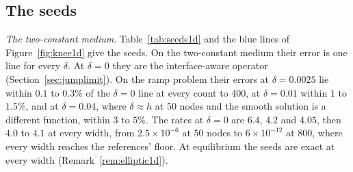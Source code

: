 \documentclass[11pt]{amsart}
\theoremstyle{definition}
\theoremstyle{remark}
\newcommand{\para}[1]{\par\smallskip\noindent\textit{#1}.\enspace}
\newcommand{\sci}[2]{#1 \times 10^{#2}}
\begin{document}
\subsection{The seeds}
\label{sec:seedrates1d}
\begin{table}
  \centering
  \caption{The seeds on the ramp problem at $t = 2$: $\|e\|_2 / \|u\|_2$ at
  the nodes, with the rate per doubling of $n$ in parentheses. Errors of
  $\sci{4}{-12}$ to $\sci{2}{-11}$ on the two-constant medium and a few
  times $10^{-11}$ on the sinusoidal one are round-off, of the references
  (Section~\ref{sec:media1d}) and of the solve, where the rates mean
  nothing.}
  \label{tab:seeds1d}
  \footnotesize
  
\end{table}

\para{The two-constant medium}
Table~\ref{tab:seeds1d} and the blue lines of Figure~\ref{fig:knee1d} give
the seeds. On the two-constant medium their error is one line for every
$\delta$. At $\delta = 0$ they are the interface-aware operator
(Section~\ref{sec:jumplimit}). On the ramp problem their errors at
$\delta = 0.0025$ lie within $0.1$ to $0.3\%$ of the $\delta = 0$ line at
every count to $400$, at $\delta = 0.01$ within $1$ to $1.5\%$, and at
$\delta = 0.04$, where $\delta \approx h$ at $50$ nodes and the smooth
solution is a different function, within $3$ to $5\%$. The rates at
$\delta = 0$ are $6.4$, $4.2$ and $4.05$, then $4.0$ to $4.1$ at every width,
from
$\sci{2.5}{-6}$ at $50$ nodes to $\sci{6}{-12}$ at $800$, where every width
reaches the references' floor. At equilibrium the seeds are exact at every
width (Remark~\ref{rem:elliptic1d}).
\end{document}
